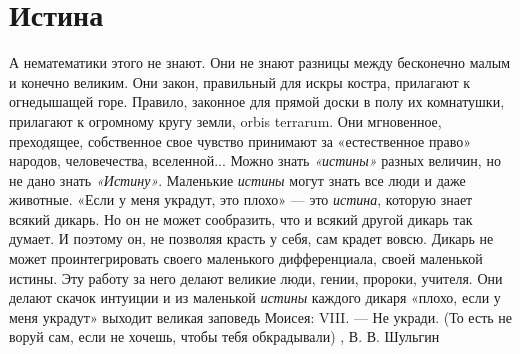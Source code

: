  
 
 
 
 
\chapter{Истина}
\label{sec:slova.istina}


А нематематики этого не знают. Они не знают разницы между бесконечно малым и
конечно великим. Они закон, правильный для искры костра, прилагают к
огнедышащей горе. Правило, законное для прямой доски в полу их комнатушки,
прилагают к огромному кругу земли, orbis terrarum. Они мгновенное,
преходящее, собственное свое чувство принимают за «естественное право» народов,
человечества, вселенной...  Можно знать \emph{«истины»} разных величин, но не
дано знать \emph{«Истину»}. Маленькие \emph{истины} могут знать все люди и даже
животные. «Если у меня украдут, это плохо» — это \emph{истина}, которую знает
всякий дикарь. Но он не может сообразить, что и всякий другой дикарь так
думает. И поэтому он, не позволяя красть у себя, сам крадет вовсю. Дикарь не
может проинтегрировать своего маленького дифференциала, своей маленькой истины.
Эту работу за него делают великие люди, гении, пророки, учителя. Они делают
скачок интуиции и из маленькой \emph{истины} каждого дикаря «плохо, если у меня
украдут» выходит великая заповедь Моисея: VIII. — Не укради. (То есть не воруй
сам, если не хочешь, чтобы тебя обкрадывали)
, В. В. Шульгин

